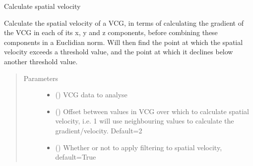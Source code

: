 \documentclass[letterpaper,10pt,english]{sphinxmanual}
\begin{document}
\begin{fulllineitems}
\label{\detokenize{_autosummary/signalanalysis.vcg.get_spatial_velocity:signalanalysis.vcg.get_spatial_velocity}}
\sphinxAtStartPar
Calculate spatial velocity

\sphinxAtStartPar
Calculate the spatial velocity of a VCG, in terms of calculating the gradient of the VCG in each of its x,
y and z components, before combining these components in a Euclidian norm. Will then find the point at which the
spatial velocity exceeds a threshold value, and the point at which it declines below another threshold value.
\begin{quote}\begin{description}
\item[{Parameters}] \leavevmode\begin{itemize}
\item {} 
\sphinxAtStartPar
{} () \textendash{} VCG data to analyse

\item {} 
\sphinxAtStartPar
{} (\sphinxstyleliteralemphasis{\sphinxupquote{, }}) \textendash{} Offset between values in VCG over which to calculate spatial velocity, i.e. 1 will use neighbouring values to
calculate the gradient/velocity. Default=2

\item {} 
\sphinxAtStartPar
{} (\sphinxstyleliteralemphasis{\sphinxupquote{, }}) \textendash{} Whether or not to apply filtering to spatial velocity, default=True


\end{itemize}
\end{description}
\end{quote}
\end{fulllineitems}
\end{document}
